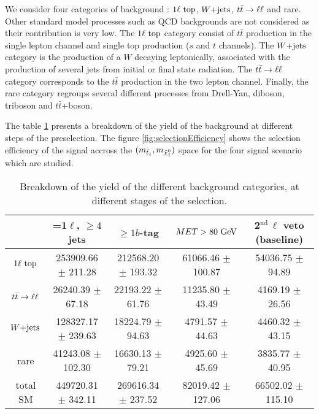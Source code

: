         We consider four categories of background : $1\ell~\text{top}$, $\text{$W$+jets}$, $t\bar{t} \rightarrow \ell \ell$ and rare. Other standard
        model processes such as QCD backgrounds are not considered as their contribution is very low. The $1\ell~\text{top}$
        category consist of $t\bar{t}$ production in the single lepton channel and single top production ($s$ and $t$ channels).
        The $\text{$W$+jets}$ category is the production of a $W$ decaying leptonically, associated with the production of several
        jets from initial or final state radiation. The $t\bar{t} \rightarrow \ell \ell$ category corresponds to the $t\bar{t}$ production
        in the two lepton channel. Finally, the rare category regroups several different processes from Drell-Yan, diboson,
        triboson and $t\bar{t}$+boson.

        The table \ref{tab:cutflowPreselection} presents a breakdown of the yield of the background at different steps of the
        preselection. The figure \ref{fig:selectionEfficiency} shows the selection efficiency of the signal accross the $(m_{\tilde{t}_1},
        m_{\tilde{\chi}_1^0})$ space for the four signal scenario which are studied. 

        \begin{table}[h!]
        \hspace*{-0.7cm}
        \begin{tabular}{|c|cccc|}
            \hline
                        & =1$\ell$, $\geq 4$ jets   & $\geq 1b$-tag             & $MET > 80 ~\text{GeV}$         &  2$^\text{nd}\, \ell$ veto (baseline) \\
            \hline
        $1\ell~\text{top}$ & 253909.66 $\pm$ 211.28    & 212568.20 $\pm$ 193.32    &  61066.46 $\pm$ 100.87  & 54036.75 $\pm$ 94.89     \\
        $t\bar{t} \rightarrow \ell \ell$  &  26240.39 $\pm$ 67.18     &  22193.22 $\pm$ 61.76     &  11235.80 $\pm$ 43.49   &  4169.19 $\pm$ 26.56     \\
        $\text{$W$+jets}$        & 128327.17 $\pm$ 239.63    &  18224.79 $\pm$ 94.63     &   4791.57 $\pm$ 44.63   &  4460.32 $\pm$ 43.15     \\
        rare            &  41243.08 $\pm$ 102.30    &  16630.13 $\pm$ 79.21     &   4925.60 $\pm$ 45.69   &  3835.77 $\pm$ 40.95     \\
            \hline
        total SM        & 449720.31 $\pm$ 342.11    & 269616.34 $\pm$ 237.52    &  82019.42 $\pm$ 127.06  & 66502.02 $\pm$ 115.10    \\
            \hline
        \end{tabular}
            \caption{Breakdown of the yield of the different background categories, at different stages of the selection.}
            \label{tab:cutflowPreselection}
        \end{table}

